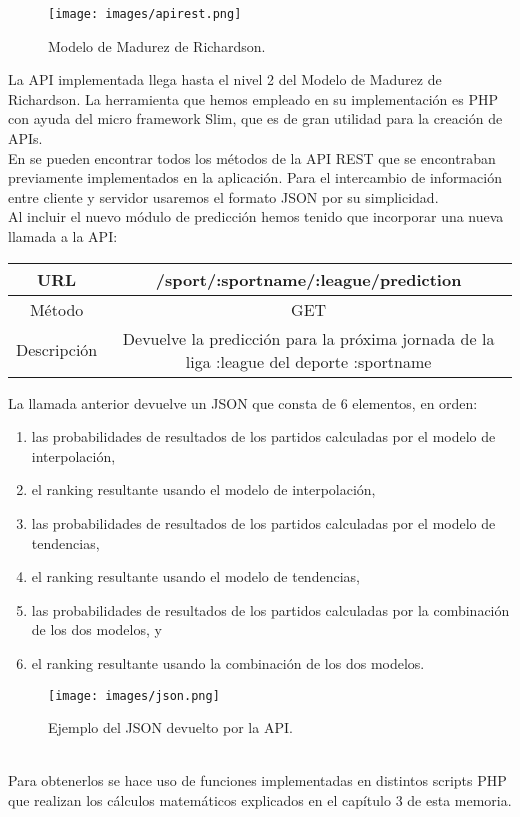 \begin{figure}[H]
	\centering
	\texttt{[image: images/apirest.png]}
	\caption{Modelo de Madurez de Richardson.}
\end{figure}

La API implementada llega hasta el nivel 2 del Modelo de Madurez de Richardson. La herramienta que hemos empleado en su implementación es PHP con ayuda del micro framework Slim, que es de gran utilidad para la creación de APIs.\\

En \cite[Anexo A]{tfgjose} se pueden encontrar todos los métodos de la API REST que se encontraban previamente implementados en la aplicación. Para el intercambio de información entre cliente y servidor usaremos el formato JSON por su simplicidad. \\

Al incluir el nuevo módulo de predicción hemos tenido que incorporar una nueva llamada a la API:
{\small \begin{center}
	\begin{tabular}{|c|c|}
	\hline URL  & /sport/:sportname/:league/prediction \\ 
	\hline Método & GET \\ 
	\hline Descripción & Devuelve la predicción para la próxima jornada de la liga :league del deporte :sportname\\ 
	\hline 
\end{tabular} 
\end{center}}

La llamada anterior devuelve un JSON que consta de 6 elementos, en orden:
\begin{enumerate}
	\item las probabilidades de resultados de los partidos calculadas por el modelo de interpolación,
	\item el ranking resultante usando el modelo de interpolación,
	\item las probabilidades de resultados de los partidos calculadas por el modelo de tendencias,
	\item el ranking resultante usando el modelo de tendencias,
	\item las probabilidades de resultados de los partidos calculadas por la combinación de los dos modelos, y
	\item el ranking resultante usando la combinación de los dos modelos.
\end{enumerate}

\begin{figure}[H]
	\centering
		\texttt{[image: images/json.png]}
	\caption{Ejemplo del JSON devuelto por la API.}
\end{figure} 
\ \\
Para obtenerlos se hace uso de funciones implementadas en distintos scripts PHP que realizan los cálculos matemáticos explicados en el capítulo 3 de esta memoria. \\

